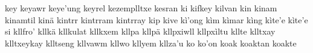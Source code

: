 \documentclass[a4paper]{article}
\begin{document}
key\hspace{2mm}
keyawr\hspace{2mm}
keye'ung\hspace{2mm}
keyrel\hspace{2mm}
kezemplltxe\hspace{2mm}
kesran\hspace{2mm}
ki\hspace{2mm}
kifkey\hspace{2mm}
kilvan\hspace{2mm}
kin\hspace{2mm}
kinam\hspace{2mm}
kinamtil\hspace{2mm}
kinä\hspace{2mm}
kintrr\hspace{2mm}
kintrram\hspace{2mm}
kintrray\hspace{2mm}
kip\hspace{2mm}
kive\hspace{2mm}
kì'ong\hspace{2mm}
kìm\hspace{2mm}
kìmar\hspace{2mm}
kìng\hspace{2mm}
kìte'e\hspace{2mm}
kìte'e si\hspace{2mm}
kllfro'\hspace{2mm}
kllkä\hspace{2mm}
kllkulat\hspace{2mm}
kllkxem\hspace{2mm}
kllpa\hspace{2mm}
kllpä\hspace{2mm}
kllpxiwll\hspace{2mm}
kllpxìltu\hspace{2mm}
kllte\hspace{2mm}
klltxay\hspace{2mm}
klltxeykay\hspace{2mm}
klltseng\hspace{2mm}
kllvawm\hspace{2mm}
kllwo\hspace{2mm}
kllyem\hspace{2mm}
kllza'u\hspace{2mm}
ko\hspace{2mm}
ko'on\hspace{2mm}
koak\hspace{2mm}
koaktan\hspace{2mm}
koakte\hspace{2mm}
\end{document}
